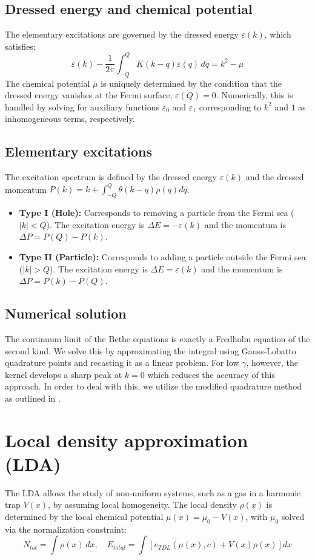 \documentclass[11pt]{article}
\begin{document}
\subsection{Dressed energy and chemical potential}
The elementary excitations are governed by the dressed energy $\varepsilon(k)$, which satisfies:
\begin{equation}
    \varepsilon(k) - \frac{1}{2\pi} \int_{-Q}^{Q} K(k - q) \varepsilon(q) \, dq = k^2 - \mu
\end{equation}
The chemical potential $\mu$ is uniquely determined by the condition that the dressed energy vanishes at the Fermi surface, $\varepsilon(Q) = 0$. Numerically, this is handled by solving for auxiliary functions $\varepsilon_0$ and $\varepsilon_1$ corresponding to $k^2$ and $1$ as inhomogeneous terms, respectively.

\subsection{Elementary excitations}
The excitation spectrum is defined by the dressed energy $\varepsilon(k)$ and the dressed momentum $P(k) = k + \int_{-Q}^Q \theta(k-q) \rho(q) dq$.
\begin{itemize}
    \item \textbf{Type I (Hole):} Corresponds to removing a particle from the Fermi sea ($|k| < Q$). The excitation energy is $\Delta E = -\varepsilon(k)$ and the momentum is $\Delta P = P(Q) - P(k)$.
    \item \textbf{Type II (Particle):} Corresponds to adding a particle outside the Fermi sea ($|k| > Q$). The excitation energy is $\Delta E = \varepsilon(k)$ and the momentum is $\Delta P = P(k) - P(Q)$.
\end{itemize}

\subsection{Numerical solution}
The continuum limit of the Bethe equations is exactly a Fredholm equation of the second kind. We solve this by approximating the integral using Gauss-Lobatto quadrature points and recasting it as a linear problem. For low $\gamma$, however, the kernel develops a sharp peak at $k=0$ which reduces the accuracy of this approach. In order to deal with this, we utilize the modified quadrature method as outlined in \cite{Fredholm2019}.

\section{Local density approximation (LDA)}
The LDA allows the study of non-uniform systems, such as a gas in a harmonic trap $V(x)$, by assuming local homogeneity. The local density $\rho(x)$ is determined by the local chemical potential $\mu(x) = \mu_0 - V(x)$, with $\mu_0$ solved via the normalization constraint:
\begin{equation}
    N_{tot} = \int \rho(x) \, dx, \quad E_{total} = \int \left[ e_{TDL}(\mu(x), c) + V(x)\rho(x) \right] dx
\end{equation}




\end{document}
